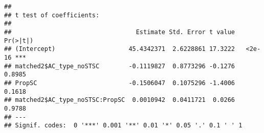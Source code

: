 \documentclass[
]{article}
\newenvironment{Shaded}{\begin{snugshade}}{\end{snugshade}}
\newcommand{\AttributeTok}[1]{\textcolor[rgb]{0.77,0.63,0.00}{#1}}
\newcommand{\FunctionTok}[1]{\textcolor[rgb]{0.00,0.00,0.00}{#1}}
\newcommand{\NormalTok}[1]{#1}
\newcommand{\OtherTok}[1]{\textcolor[rgb]{0.56,0.35,0.01}{#1}}
\newcommand{\SpecialCharTok}[1]{\textcolor[rgb]{0.00,0.00,0.00}{#1}}
\newcommand{\StringTok}[1]{\textcolor[rgb]{0.31,0.60,0.02}{#1}}
\begin{document}
\begin{Shaded}
\end{Shaded}

\begin{verbatim}
## 
## t test of coefficients:
## 
##                                  Estimate Std. Error t value Pr(>|t|)    
## (Intercept)                    45.4342371  2.6228861 17.3222   <2e-16 ***
## matched2$AC_type_noSTSC        -0.1119827  0.8773296 -0.1276   0.8985    
## PropSC                         -0.1506047  0.1075296 -1.4006   0.1618    
## matched2$AC_type_noSTSC:PropSC  0.0010942  0.0411721  0.0266   0.9788    
## ---
## Signif. codes:  0 '***' 0.001 '**' 0.01 '*' 0.05 '.' 0.1 ' ' 1
\end{verbatim}

\begin{Shaded}
\end{Shaded}
\end{document}
